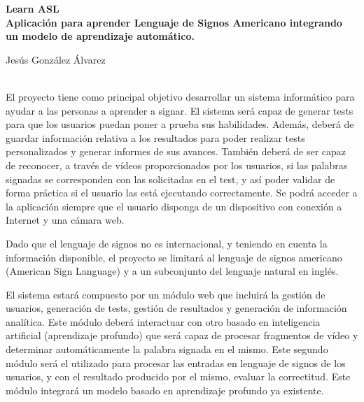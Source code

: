 \cleardoublepage

\begin{center}
	{\large\bfseries Learn ASL \\ Aplicación para aprender Lenguaje de Signos Americano integrando un modelo de aprendizaje automático.}\\
\end{center}
\begin{center}
	Jesús González Álvarez\\
\end{center}
\vspace{0.5cm}
\vspace{0.7cm}

\\

\bigskip
El proyecto tiene como principal objetivo desarrollar un sistema informático para ayudar a las personas a aprender a signar. El sistema será capaz de generar tests para que los usuarios puedan poner a prueba sus habilidades. Además, deberá de guardar información relativa a los resultados para poder realizar tests personalizados y generar informes de sus avances. También deberá de ser capaz de reconocer, a través de vídeos proporcionados por los usuarios, si las palabras signadas se corresponden con las solicitadas en el test, y así poder validar de forma práctica si el usuario las está ejecutando correctamente. Se podrá acceder a la aplicación siempre que el usuario disponga de un dispositivo con conexión a Internet y una cámara web.

\bigskip
Dado que el lenguaje de signos no es internacional, y teniendo en cuenta la información disponible, el proyecto se limitará al lenguaje de signos americano (American Sign Language) y a un subconjunto del lenguaje natural en inglés.

\bigskip
El sistema estará compuesto por un módulo web que incluirá la gestión de usuarios, generación de tests, gestión de resultados y generación de información analítica. Este módulo deberá interactuar con otro basado en inteligencia artificial (aprendizaje profundo) que será capaz de procesar fragmentos de vídeo y determinar automáticamente la palabra signada en el mismo. Este segundo módulo será el utilizado para procesar las entradas en lenguaje de signos de los usuarios, y con el resultado producido por el mismo, evaluar la correctitud. Este módulo integrará un modelo basado en aprendizaje profundo ya existente.


